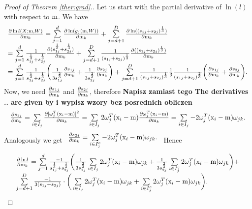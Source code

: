 \begin{proof}[Proof of Theorem \ref{ther:grad}.]
Let us start with the partial derivative of $\ln({l})$ with respect to $\mathrm{m}$. We have
$$
\begin{array}{l}
\frac{\partial \ln {l}(X;\m,W)}{\partial \m_k} =
\sum \limits_{j=1}^d \frac{\partial \ln ({g}_j(\m,W))}{\partial \m_k} + \sum \limits_{j=d+1}^D \frac{\partial \ln ((s_{1j}+s_{2j})^{\frac{1}{3}})}{\partial \m_k} \\[6pt]
= \sum\limits_{j=1}^d \frac{1}{{s}_{1j}^{\frac{1}{3}} + {s}_{2j}^{\frac{1}{3}}} \frac{\partial ({s}_{1j}^{\frac{1}{3}} + {s}_{2j}^{\frac{1}{3}})}{\partial \m_k} + \sum\limits_{j=d+1}^D \frac{1}{({s}_{1j} + {s}_{2j})^{\frac{1}{3}}} \frac{\partial (({s}_{1j} + {s}_{2j})^{\frac{1}{3}})}{\partial \m_k} \\[6pt]
= \sum \limits_{j=1}^d \frac{1}{{s}_{1j}^{\frac{1}{3}} + {s}_{2j}^{\frac{1}{3}}} \bigg(
\frac{1}{3 {s}_{1j}^{\frac{2}{3}}} \frac{\partial {s}_{1j}}{\partial \m_k} +
\frac{1}{3 {s}_{2j}^{\frac{2}{3}}} \frac{\partial {s}_{2j}}{\partial \m_k}
\bigg) %
+ \sum \limits_{j=d+1}^D \frac{1}{({s}_{1j} + {s}_{2j})^{\frac{1}{3}}} \frac{1}{3} \frac{1}{({s}_{1j} + {s}_{2j})^{\frac{2}{3}}}\bigg(
\frac{\partial {s}_{1j}}{\partial \m_k} +
\frac{\partial {s}_{2j}}{\partial \m_k}
\bigg).
\end{array}
$$
Now, we need $\frac{\partial {s}_{1j}}{\partial \mathrm{m}_k}$ and $\frac{\partial {s}_{2j}}{\partial \mathrm{m}_k}$, therefore \textbf{Napisz zamiast tego The derivatives .. are given by i wypisz wzory bez posrednich obliczen}
$$
\begin{array}{l}
\frac{\partial {s}_{1j}}{\partial \m_k} = 
\sum\limits_{i \in {I}_j} \frac{\partial [\w^T_j (\x_i - \m)]^2}{\partial \m_k} =%
 \sum\limits_{i \in {I}_j} 2 \w^T_j (\x_i - \m) \frac{\partial \w^T_j (\x_i - \m)}{\partial \m_k} = %
 \sum\limits_{i \in {I}_j} - 2 \w^T_j (\x_i - \m) \w_{jk}.
\end{array}
$$
Analogously we get
$
\begin{array}{l}
\frac{\partial {s}_{2j}}{\partial \mathrm{m}_k} = \sum\limits_{i \in {I}_j^c} -2 \omega^T_j (\mathrm{x}_i - \mathrm{m}) \omega_{jk}.
\end{array}
$
Hence 
$$
\begin{array}{l}
\frac{\partial \ln {l}}{\partial \m_k} =\sum\limits_{j=1}^d \frac{-1}{{s}_{1j}^{\frac{1}{3}} + {s}_{2j}^{\frac{1}{3}}} \bigg(
\frac{1}{3 {s}_{1j}^{\frac{2}{3}}} \sum\limits_{i \in I_j} 2 \w_j^T (\x_i - \m)  \w_{jk} + %
\frac{1}{3 {s}_{2j}^{\frac{2}{3}}} \sum\limits_{i \in I_j^c} 2 \w_j^T (\x_i - \m) \w_{jk}
\bigg) + \\[6pt]
 \sum\limits_{j=d+1}^D \frac{-1}{3(s_{1j}+s_{2j})} \cdot 
\bigg(
 \sum\limits_{i \in I_j} 2 \w_j^T (\x_i - \m)  \w_{jk} +%
 \sum\limits_{i \in I_j^c} 2 \w_j^T (\x_i - \m) \w_{jk}
\bigg)
.
\end{array}
$$


\end{proof}
